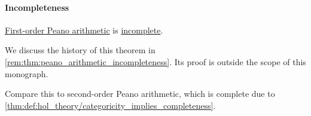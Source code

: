 \paragraph{Incompleteness}

\begin{theorem}\label{thm:peano_arithmetic_incompleteness}
  \hyperref[def:peano_arithmetic]{First-order Peano arithmetic} is \hyperref[def:fol_theory/complete]{incomplete}.
\end{theorem}
\begin{comments}
  \item We discuss the history of this theorem in \cref{rem:thm:peano_arithmetic_incompleteness}. Its proof is outside the scope of this monograph.

  \item Compare this to second-order Peano arithmetic, which is complete due to \cref{thm:def:hol_theory/categoricity_implies_completeness}.
\end{comments}

